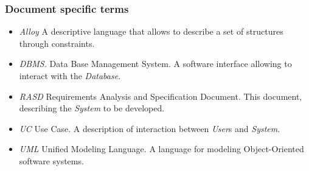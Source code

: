 \subsubsection{Document specific terms}
\begin{itemize}
	\item \emph{Alloy}
	A descriptive language that allows to describe a set of structures through constraints.
	\item \emph{DBMS.}
	Data Base Management System. A software interface allowing to interact with the \emph{Database}.
	\item \emph{RASD}
	Requirements Analysis and Specification Document. This document, describing the \emph{System} to be developed.
	\item \emph{UC}
	Use Case. A description of interaction between \emph{User}s and \emph{System}.
	\item \emph{UML}
	Unified Modeling Language. A language for modeling Object-Oriented software systems.
\end{itemize}
